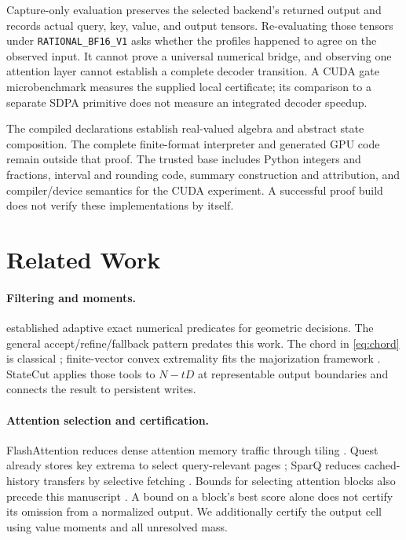 \documentclass{article}
\theoremstyle{plain}
\theoremstyle{definition}
\theoremstyle{remark}
\newcommand{\profile}{\texttt{RATIONAL\_BF16\_V1}}
\begin{document}
Capture-only evaluation preserves the selected backend's returned output
and records actual query, key, value, and output tensors. Re-evaluating
those tensors under \profile{} asks whether the profiles happened to
agree on the observed input. It cannot prove a universal numerical bridge,
and observing one attention layer cannot establish a complete decoder
transition. A CUDA gate microbenchmark measures the supplied local
certificate; its comparison to a separate SDPA primitive does not measure
an integrated decoder speedup.


The compiled declarations establish real-valued algebra and abstract state
composition. The complete finite-format interpreter and generated GPU code
remain outside that proof.
The trusted base includes Python integers and fractions, interval and
rounding code, summary construction and attribution, and compiler/device
semantics for the CUDA experiment. A successful proof build does not verify
these implementations by itself.

\section{Related Work}
\label{sec:related}

\paragraph{Filtering and moments.}
\citet{shewchuk1997} established adaptive exact numerical predicates for
geometric decisions. The general accept/refine/fallback pattern predates
this work. The chord in \cref{eq:chord} is classical
\citep{edmundson1957,madansky1959}; finite-vector convex extremality fits
the majorization framework \citep{marshall2011}. StateCut applies those
tools to $N-tD$ at representable output boundaries and connects the result
to persistent writes.

\paragraph{Attention selection and certification.}
FlashAttention reduces dense attention memory traffic through tiling
\citep{dao2022flashattention}. Quest already stores key extrema to select
query-relevant pages \citep{tang2024quest}; SparQ reduces cached-history
transfers by selective fetching \citep{ribar2024sparq}. Bounds for selecting
attention blocks also precede this manuscript \citep{butucea2026screening}.
A bound on a block's best score alone does not certify its omission from
a normalized output. We additionally certify the output cell using value
moments and all unresolved mass.
\end{document}
